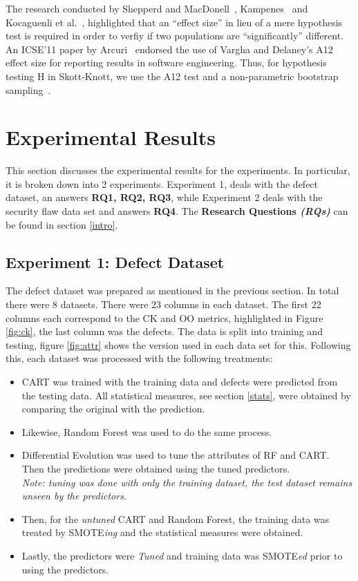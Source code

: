 \documentclass[12pt]{IEEEtran}
\begin{document}
The research conducted by Shepperd and MacDonell~\cite{shepperd12a}, Kampenes~\cite{kampenes07} and Kocaguenli et al.~\cite{kocharm13}, highlighted that an ``effect size'' in lieu of a mere hypothesis test is required in order to verfiy if two populations are ``significantly'' different. An ICSE'11 paper by Arcuri~\cite{arcuri11} endorsed the use of Vargha and Delaney's A12 effect size for reporting results in software engineering. Thus, for hypothesis testing H in Skott-Knott, we use the A12 test and a non-parametric bootstrap sampling~\cite{efron93}.


\section{Experimental Results}
\label{expt}
This section discusses the experimental results for the experiments. In particular, it is broken down into 2 experiments. Experiment 1, deals with the defect dataset, an answers \textbf{RQ1, RQ2, RQ3}, while Experiment 2 deals with the security flaw data set and answers \textbf{RQ4}. The \textbf{Research Questions \textit{(RQs)}} can be found in section \ref{intro}.

\subsection*{Experiment 1: Defect Dataset} \label{exp1}

The defect dataset was prepared as mentioned in the previous section. In total there were 8 datasets. There were 23 columns in each dataset. The first 22 columns each correspond to the CK and OO metrics, highlighted in Figure \ref{fig:ck}, the last column was the defects. The data is split into training and testing, figure \ref{fig:attr} shows the version used in each data set for this. Following this, each dataset was processed with the following treatments:
\begin{itemize}
\item CART was trained with the training data and defects were predicted from the testing data. All statistical measures, see section \ref{stats}, were obtained by comparing the original with the prediction.
\item Likewise, Random Forest was used to do the same process.
\item Differential Evolution was used to tune the attributes of RF and CART. Then the predictions were obtained using the tuned predictors. \\ \textit{Note: tuning was done with only the training dataset, the test dataset remains unseen by the predictors.}
\item Then, for the \textit{untuned} CART and Random Forest, the training data was treated by SMOTE\textit{ing} and the statistical measures were obtained.
\item Lastly, the predictors were \textit{Tuned} and training data was SMOTE\textit{ed} prior to using the predictors.
 
\end{itemize}
\end{document}
